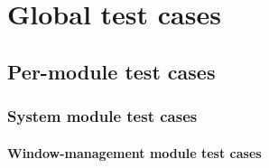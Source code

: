 \chapter{Global test cases}
\label{ch:tests}


\makeatletter
\newcommand{\fmt}[1]{(tests \specref{#1}\checknextarg}
\newcommand{\checknextarg}{\@ifnextchar\bgroup{\consumenextarg}{)}}
\newcommand{\consumenextarg}[1]{, \specref{#1}\@ifnextchar\bgroup{\consumenextarg}{)}}
\makeatother

\newcommand{\test}[5]{\addtocounter{counterTC}{10}
\item[TC\arabic{counterTC}\phantomsection\label{TC\arabic{counterTC}}\\\begin{footnotesize}\textit{#1}\end{footnotesize}]
    \begin{itemize}[noitemsep]
        \item[]{\textbf{#2}} %
        \item[]{Precondition: #3}
        \item[]{Test steps: #4}
        \item[]{Expected result: #5}
    \end{itemize}
}

\newenvironment{tests}{\begin{itemize}[font = \normalfont, style = multiline, labelwidth = 60pt, leftmargin = !]}{\end{itemize}}

\section{Per-module test cases}

\subsection{System module test cases}

\subsubsection{Window-management module test cases}

